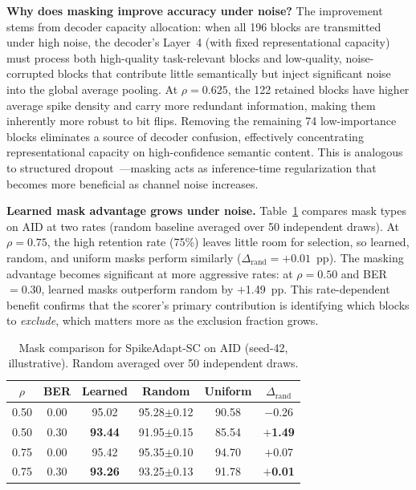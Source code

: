 \documentclass[conference]{IEEEtran}
\begin{document}
\textbf{Why does masking improve accuracy under noise?} The improvement stems from decoder capacity allocation: when all 196 blocks are transmitted under high noise, the decoder's Layer~4 (with fixed representational capacity) must process both high-quality task-relevant blocks and low-quality, noise-corrupted blocks that contribute little semantically but inject significant noise into the global average pooling. At $\rho{=}0.625$, the 122 retained blocks have higher average spike density and carry more redundant information, making them inherently more robust to bit flips. Removing the remaining 74 low-importance blocks eliminates a source of decoder confusion, effectively concentrating representational capacity on high-confidence semantic content. This is analogous to structured dropout~\cite{ghiasi2018dropblock}---masking acts as inference-time regularization that becomes more beneficial as channel noise increases.

\textbf{Learned mask advantage grows under noise.} Table~\ref{tab:mask_compare} compares mask types on AID at two rates (random baseline averaged over 50 independent draws). At $\rho{=}0.75$, the high retention rate (75\%) leaves little room for selection, so learned, random, and uniform masks perform similarly ($\Delta_{\text{rand}} = +0.01$~pp). The masking advantage becomes significant at more aggressive rates: at $\rho{=}0.50$ and BER${=}0.30$, learned masks outperform random by $+$1.49~pp. This rate-dependent benefit confirms that the scorer's primary contribution is identifying which blocks to \emph{exclude}, which matters more as the exclusion fraction grows.

\begin{table}[t]
\renewcommand{\arraystretch}{1.15}
\centering
\caption{Mask comparison for SpikeAdapt-SC on AID (seed-42, illustrative). Random averaged over 50 independent draws.}
\label{tab:mask_compare}
\begin{tabular}{c c ccc c}
\toprule
$\rho$ & \textbf{BER} & \textbf{Learned} & \textbf{Random} & \textbf{Uniform} & $\Delta_{\text{rand}}$ \\
\midrule
0.50 & 0.00 & 95.02 & 95.28{\scriptsize$\pm$0.12} & 90.58 & $-$0.26 \\
0.50 & 0.30 & \textbf{93.44} & 91.95{\scriptsize$\pm$0.15} & 85.54 & $+$\textbf{1.49} \\
\midrule
0.75 & 0.00 & 95.42 & 95.35{\scriptsize$\pm$0.10} & 94.70 & $+$0.07 \\
0.75 & 0.30 & \textbf{93.26} & 93.25{\scriptsize$\pm$0.13} & 91.78 & $+$\textbf{0.01} \\
\bottomrule
\end{tabular}
\end{table}
\end{document}
